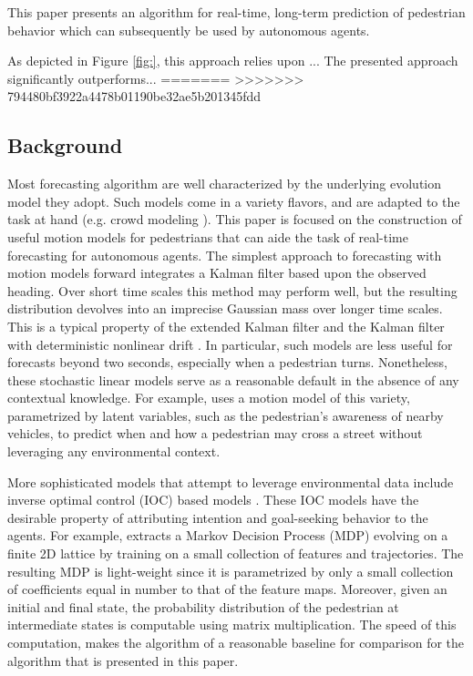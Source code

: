 \documentclass[letterpaper,10pt,conference]{ieeeconf}
\begin{document}
This paper presents an algorithm for real-time, long-term prediction of pedestrian behavior which can subsequently be used by autonomous agents.

As depicted in Figure \ref{fig:}, this approach relies upon ... 
The presented approach significantly outperforms...
=======
>>>>>>> 794480bf3922a4478b01190be32ae5b201345fdd


\subsection{Background}
Most forecasting algorithm are well characterized by the underlying evolution model they adopt.
Such models come in a variety flavors, and are adapted to the task at hand (e.g. crowd modeling \cite{Helbing1992}).
This paper is focused on the construction of useful motion models for pedestrians that can aide the task of real-time forecasting for autonomous agents.
The simplest approach to forecasting with motion models forward integrates a Kalman filter \cite{kalman1960new} based upon the observed heading.
Over short time scales this method may perform well, but the resulting distribution devolves into an imprecise Gaussian mass over longer time scales.
This is a typical property of the extended Kalman filter and the Kalman filter with deterministic nonlinear drift \cite{Schneider2013}.
In particular, such models are less useful for forecasts beyond two seconds, especially when a pedestrian turns.
Nonetheless, these stochastic linear models serve as a reasonable default in the absence of any contextual knowledge.
For example, \cite{Kooji2014} uses a motion model of this variety, parametrized by latent variables, such as the pedestrian's awareness of nearby vehicles, to predict when and how a pedestrian may cross a street without leveraging any environmental context.

More sophisticated models that attempt to leverage environmental data include inverse optimal control (IOC) based models \cite{Ziebart2008,Ziebart2009,Kitani2012,Xie2013,Karasev2016}.
These IOC models have the desirable property of attributing intention and goal-seeking behavior to the agents.
For example, \cite{Kitani2012} extracts a Markov Decision Process (MDP) evolving on a finite 2D lattice by training on a small collection of features and trajectories.
The resulting MDP is light-weight since it is parametrized by only a small collection of coefficients equal in number to that of the feature maps.
Moreover, given an initial and final state, the probability distribution of the pedestrian at intermediate states is computable using matrix multiplication.
The speed of this computation, makes the algorithm of \cite{Kitani2012} a reasonable baseline for comparison for the algorithm that is presented in this paper.
\end{document}
